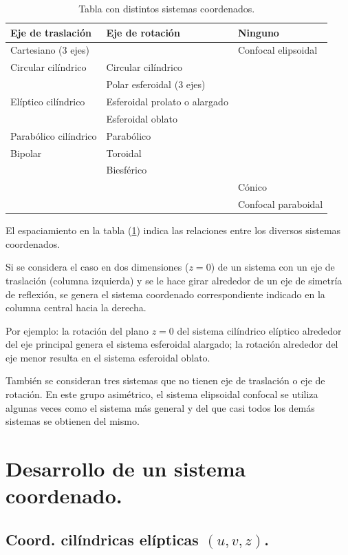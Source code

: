 \documentclass[12pt]{article}
\numberwithin{equation}{section}
\begin{document}
\renewcommand{\arraystretch}{1.2}
\begin{table}[H]
\centering
\begin{tabular}{p{4cm} p{6cm} p{4cm}}
Eje de traslación & Eje de rotación & Ninguno \\ \hline
Cartesiano ($3$ ejes) & & Confocal elipsoidal \\
Circular cilíndrico & Circular cilíndrico & \\
& Polar esferoidal ($3$ ejes) & \\
Elíptico cilíndrico & Esferoidal prolato o alargado & \\
& Esferoidal oblato & \\
Parabólico cilíndrico & Parabólico & \\
Bipolar & Toroidal & \\
& Biesférico & \\[0.5em]
& & Cónico \\
& & Confocal paraboidal \\
\end{tabular}
\caption{Tabla con distintos sistemas coordenados.}
\label{table:tabla_01}
\end{table}

El espaciamiento en la tabla (\ref{table:tabla_01}) indica las relaciones entre los diversos sistemas coordenados.
\par
Si se considera el caso en dos dimensiones ($z = 0$) de un sistema con un eje de traslación (columna izquierda) y se le hace girar alrededor de un eje de simetría de reflexión, se genera el sistema coordenado correspondiente indicado en la columna central hacia la derecha.
\par
Por ejemplo: la rotación del plano $z = 0$ del sistema cilíndrico elíptico alrededor del eje principal genera el sistema esferoidal alargado; la rotación alrededor del eje menor resulta en el sistema esferoidal oblato.
\par
También se consideran tres sistemas que no tienen eje de traslación o eje de rotación. En este grupo asimétrico, el sistema elipsoidal confocal se utiliza algunas veces como el sistema más general y del que casi todos los demás sistemas se obtienen del mismo.

\section{Desarrollo de un sistema coordenado.}

\subsection{Coord. cilíndricas elípticas \texorpdfstring{$(u, v, z)$}{(u, v, z)}.}
\end{document}
